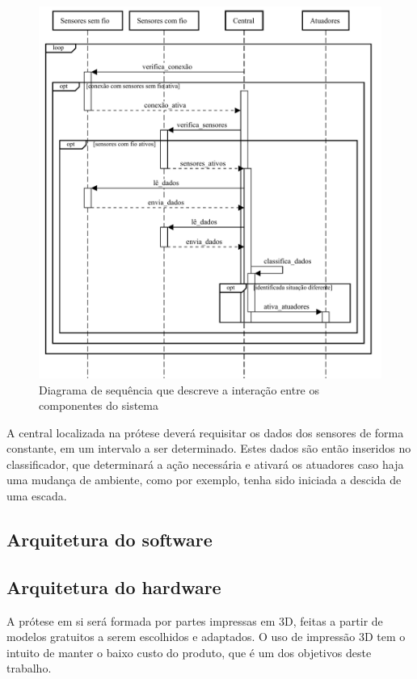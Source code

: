 \begin{figure}[ht]
	\caption{\label{fig:sequence_diagram}Diagrama de sequência que descreve a interação entre os componentes do sistema}
	\begin{center}
	    \includegraphics[width=\textwidth]{resources/sequence_diagram.pdf}
	\end{center}
\end{figure}

A central localizada na prótese deverá requisitar os dados dos sensores de forma constante, em um intervalo a ser determinado. Estes dados são então inseridos no classificador, que determinará a ação necessária e ativará os atuadores caso haja uma mudança de ambiente, como por exemplo,  tenha sido iniciada a descida de uma escada.

\subsection{Arquitetura do software}\label{sec:metodo_prot_software}

\subsection{Arquitetura do hardware}\label{sec:metodo_prot_hardware}
A prótese em si será formada por partes impressas em 3D, feitas a partir de modelos gratuitos a serem escolhidos e adaptados. O uso de impressão 3D tem o intuito de manter o baixo custo do produto, que é um dos objetivos deste trabalho.


